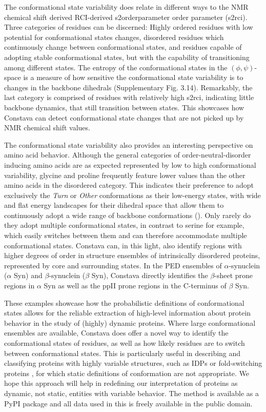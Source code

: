 The conformational state variability does relate in different ways to the NMR chemical shift derived RCI-derived \gls{s2orderparameter} order parameter (\gls{s2rci}). Three categories of residues can be discerned: Highly ordered residues with low potential for conformational states changes, disordered residues which continuously change between conformational states, and residues capable of adopting stable conformational states, but with the capability of transitioning among different states. The entropy of the conformational states in the $(\phi, \psi)$-space is a measure of how sensitive the conformational state variability is to changes in the backbone dihedrals (Supplementary Fig. 3.14).
Remarkably, the last category is comprised of residues with relatively high \gls{s2rci}, indicating little backbone dynamics, that still transition between states. This showcases how Constava can detect conformational state changes that are not picked up by NMR chemical shift values.

The conformational state variability also provides an interesting perspective on amino acid behavior. Although the general categories of order-neutral-disorder inducing amino acids are as expected represented by low to high conformational variability, glycine and proline frequently feature lower values than the other amino acids in the disordered category. This indicates their preference to adopt exclusively the \textit{Turn} or \textit{Other} conformations as their low-energy states, with wide and flat energy landscapes for their dihedral space that allow them to continuously adopt a wide range of backbone conformations (). Only rarely do they adopt multiple conformational states, in contrast to serine for example, which easily switches between them and can therefore accommodate multiple conformational states. Constava can, in this light, also identify regions with higher degrees of order in structure ensembles of intrinsically disordered proteins, represented by core and surrounding states. In the PED ensembles of $\alpha$-synuclein ($\alpha$ Syn) and $\beta$-synuclein ($\beta$ Syn), Constava directly identifies the $\beta$-sheet prone regions in $\alpha$ Syn as well as the ppII prone regions in the C-terminus of $\beta$ Syn.

These examples showcase how the probabilistic definitions of conformational states allows for the reliable extraction of high-level information about protein behavior in the study of (highly) dynamic proteins. Where large conformational ensembles are available, Constava does offer a novel way to identify the conformational states of residues, as well as how likely residues are to switch between conformational states. This is particularly useful in describing and classifying proteins with highly variable structures, such as IDPs \cite{tompa_intrinsically_2012} or fold-switching proteins \cite{porter_extant_2018}, for which static definitions of conformation are not appropriate. We hope this approach will help in redefining our interpretation of proteins as dynamic, not static, entities with variable behavior. The method is available as a PyPI package and all data used in this is freely available in the public domain.

